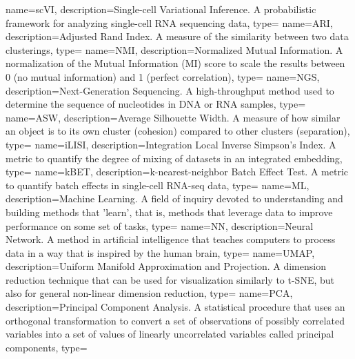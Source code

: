 {
    name={scVI},
    description={Single-cell Variational Inference. A probabilistic framework for analyzing single-cell RNA sequencing data},
    type=\acronymtype
}
{
    name={ARI},
    description={Adjusted Rand Index. A measure of the similarity between two data clusterings},
    type=\acronymtype
}
{
    name={NMI},
    description={Normalized Mutual Information. A normalization of the Mutual Information (MI) score to scale the results between 0 (no mutual information) and 1 (perfect correlation)},
    type=\acronymtype
}
{
    name={NGS},
    description={Next-Generation Sequencing. A high-throughput method used to determine the sequence of nucleotides in DNA or RNA samples},
    type=\acronymtype
}
{
    name={ASW},
    description={Average Silhouette Width. A measure of how similar an object is to its own cluster (cohesion) compared to other clusters (separation)},
    type=\acronymtype
}
{
    name={iLISI},
    description={Integration Local Inverse Simpson’s Index. A metric to quantify the degree of mixing of datasets in an integrated embedding},
    type=\acronymtype
}
{
    name={kBET},
    description={k-nearest-neighbor Batch Effect Test. A metric to quantify batch effects in single-cell RNA-seq data},
    type=\acronymtype
}
{
    name={ML},
    description={Machine Learning. A field of inquiry devoted to understanding and building methods that 'learn', that is, methods that leverage data to improve performance on some set of tasks},
    type=\acronymtype
}
{
    name={NN},
    description={Neural Network. A method in artificial intelligence that teaches computers to process data in a way that is inspired by the human brain},
    type=\acronymtype
}
{
    name={UMAP},
    description={Uniform Manifold Approximation and Projection. A dimension reduction technique that can be used for visualization similarly to t-SNE, but also for general non-linear dimension reduction},
    type=\acronymtype
}
{
    name={PCA},
    description={Principal Component Analysis. A statistical procedure that uses an orthogonal transformation to convert a set of observations of possibly correlated variables into a set of values of linearly uncorrelated variables called principal components},
    type=\acronymtype
}
